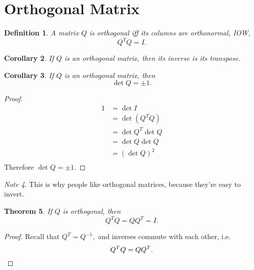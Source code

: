 \documentclass[20pt]{extarticle}
\title{}
\author{Trong}
\date{\today}
\theoremstyle{plain}
\newtheorem{theorem}{Theorem}
\newtheorem{corollary}[theorem]{Corollary}
\newtheorem{definition}[theorem]{Definition}
\theoremstyle{definition}
\theoremstyle{remark}
\newtheorem{note}[theorem]{Note}
\newcommand{\0}{\varnothing}
\newcommand{\<}{\langle}
\renewcommand{\>}{\rangle}
\begin{document}
\sloppy
\maketitle
\thispagestyle{empty}
\pagestyle{empty}

\tableofcontents
\pagebreak

\section{Orthogonal Matrix}

\begin{definition}
  A matrix \( Q \) is orthogonal iff its columns are orthonormal, IOW,
  \[
  Q^{T} Q = I.
  \]
\end{definition}

\begin{corollary}
  If \( Q \) is an orthogonal matrix, then its inverse is its transpose.
\end{corollary}

\begin{corollary}
  If \( Q \) is an orthogonal matrix, then
\[
\det Q = \pm 1.
\]
\end{corollary}

\begin{proof}
  \[
\begin{aligned}
1 &= \det I \\
  &= \det(Q^{T} Q) \\
  &= \det Q^{T} \det Q \\
  &= \det Q \det Q \\
  &= (\det Q)^{2} \\
\end{aligned}
\]
Therefore \( \det Q = \pm 1. \)
\end{proof}

\begin{note}
  This is why people like orthogonal matrices, because they're easy to invert.
\end{note}

\begin{theorem}
  If \( Q \) is orthogonal, then
\[
Q^{T} Q = Q Q^{T} = I.
\]
\end{theorem}

\begin{proof}
  Recall that \( Q^{T} = Q^{-1}, \) and inverses commute with each other, i.e.
\[
Q^{T} Q = Q Q^{T}. \qedhere
\]
\end{proof}
\end{document}
